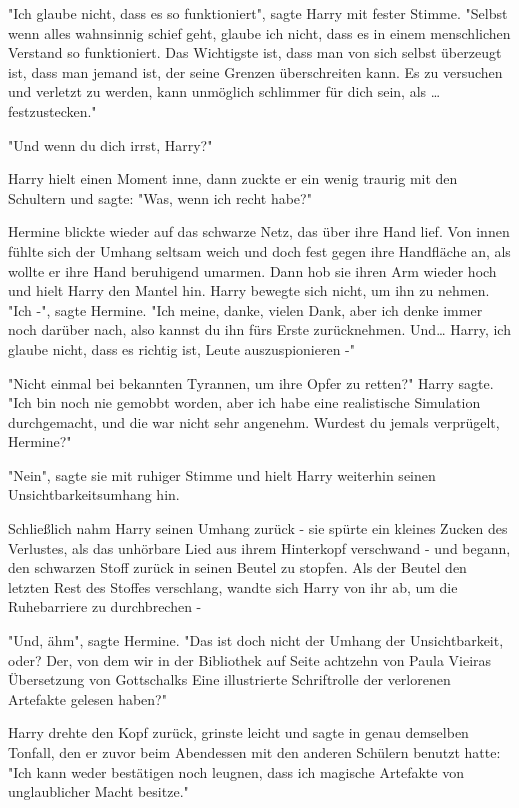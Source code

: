 {"Ich glaube nicht, dass es so funktioniert", sagte Harry mit fester Stimme. "Selbst wenn alles wahnsinnig schief geht, glaube ich nicht, dass es in einem menschlichen Verstand so funktioniert. Das Wichtigste ist, dass man von sich selbst überzeugt ist, dass man jemand ist, der seine Grenzen überschreiten kann. Es zu versuchen und verletzt zu werden, kann unmöglich schlimmer für dich sein, als … festzustecken."

"Und wenn du dich irrst, Harry?"

Harry hielt einen Moment inne, dann zuckte er ein wenig traurig mit den Schultern und sagte: "Was, wenn ich recht habe?"

Hermine blickte wieder auf das schwarze Netz, das über ihre Hand lief. Von innen fühlte sich der Umhang seltsam weich und doch fest gegen ihre Handfläche an, als wollte er ihre Hand beruhigend umarmen. Dann hob sie ihren Arm wieder hoch und hielt Harry den Mantel hin. Harry bewegte sich nicht, um ihn zu nehmen. "Ich -", sagte Hermine. "Ich meine, danke, vielen Dank, aber ich denke immer noch darüber nach, also kannst du ihn fürs Erste zurücknehmen. Und… Harry, ich glaube nicht, dass es richtig ist, Leute auszuspionieren -"

"Nicht einmal bei bekannten Tyrannen, um ihre Opfer zu retten?" Harry sagte. "Ich bin noch nie gemobbt worden, aber ich habe eine realistische Simulation durchgemacht, und die war nicht sehr angenehm. Wurdest du jemals verprügelt, Hermine?"

"Nein", sagte sie mit ruhiger Stimme und hielt Harry weiterhin seinen Unsichtbarkeitsumhang hin.

Schließlich nahm Harry seinen Umhang zurück - sie spürte ein kleines Zucken des Verlustes, als das unhörbare Lied aus ihrem Hinterkopf verschwand - und begann, den schwarzen Stoff zurück in seinen Beutel zu stopfen. Als der Beutel den letzten Rest des Stoffes verschlang, wandte sich Harry von ihr ab, um die Ruhebarriere zu durchbrechen -

"Und, ähm", sagte Hermine. "Das ist doch nicht der Umhang der Unsichtbarkeit, oder? Der, von dem wir in der Bibliothek auf Seite achtzehn von Paula Vieiras Übersetzung von Gottschalks Eine illustrierte Schriftrolle der verlorenen Artefakte gelesen haben?"

Harry drehte den Kopf zurück, grinste leicht und sagte in genau demselben Tonfall, den er zuvor beim Abendessen mit den anderen Schülern benutzt hatte: "Ich kann weder bestätigen noch leugnen, dass ich magische Artefakte von unglaublicher Macht besitze."

}
